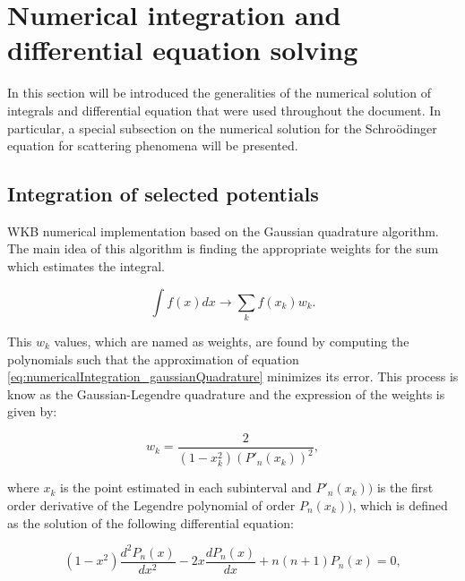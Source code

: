 \documentclass[openany]{book}
\begin{document}
\chapter{Numerical integration and differential equation solving} \label{ap:numericalSolving}


In this section will be introduced the generalities of the numerical solution of integrals and differential equation that were used throughout the document. In particular, a special subsection on the numerical solution for the Schroödinger equation for scattering phenomena will be presented. 

\section{Integration of selected potentials} \label{sec:integrationPotentials}

WKB numerical implementation based on the Gaussian quadrature algorithm. \\

The main idea of this algorithm is finding the appropriate weights for the sum which estimates the integral. 

\begin{equation}\label{eq:numericalIntegration_gaussianQuadrature}
	\int f(x) dx \rightarrow \sum_{k}{ f(x_k) w_k}.
\end{equation}

This $w_k$ values, which are named as weights, are found by computing the polynomials such that the approximation of equation \ref{eq:numericalIntegration_gaussianQuadrature} minimizes its error. This process is know as the Gaussian-Legendre quadrature and the expression of the weights is given by: 

\begin{equation}\label{eq:numericalIntegration_gaussianQuadrature_weights}
	w_k = \frac{2}{(1 - x^2_k)(P'_n(x_k))^2},
\end{equation}

where $x_k$ is the point estimated in each subinterval and $P'_n(x_k))$ is the first order derivative of the Legendre polynomial of order $P_n(x_k))$, which is defined as the solution of the following differential equation: 

\begin{equation}\label{eq:numericalIntegration_gaussianQuadrature_Legendre_equation}
	(1 - x^2)\frac{d^2P_n(x)}{dx^2} - 2x\frac{dP_n(x)}{dx} + n(n+1)P_n(x) = 0,
\end{equation}
\end{document}
